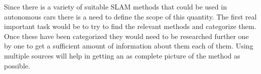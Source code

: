 Since there is a variety of suitable SLAM methods that could be used in
autonomous cars there is a need to define the scope of this quantity. The first
real important task would be to try to find the relevant methods and categorize
them. Once these have been categorized they would need to be researched further
one by one to get a sufficient amount of information about them each of them.
Using multiple sources will help in getting an as complete picture of the
method as possible.
